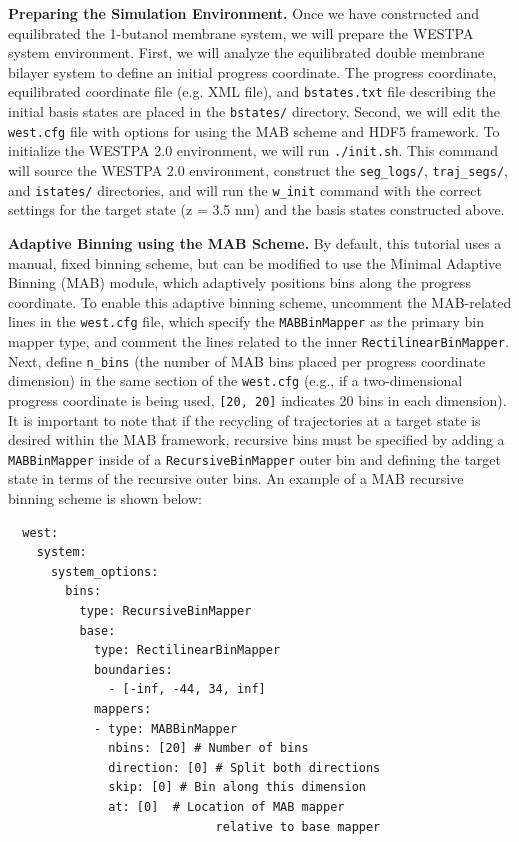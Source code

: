 \textbf{Preparing the Simulation Environment.}  Once we have constructed and equilibrated the 1-butanol membrane system, we will prepare the WESTPA system environment. 
First, we will analyze the equilibrated double membrane bilayer system to define an initial progress coordinate. 
The progress coordinate, equilibrated coordinate file (e.g. XML file), and \verb|bstates.txt| file describing the initial basis states are placed in the \verb|bstates/| directory. 
Second, we will edit the \verb|west.cfg| file with options for using the MAB scheme and HDF5 framework. 
To initialize the WESTPA 2.0 environment, we will run \verb|./init.sh|. 
This command will source the WESTPA 2.0 environment, construct the \verb|seg_logs/|, \verb|traj_segs/|, and \verb|istates/| directories, and will run the \verb|w_init| command with the correct settings for the target state (z = 3.5 nm) and the basis states constructed above.

\textbf{Adaptive Binning using the MAB Scheme.} By default, this tutorial uses a manual, fixed binning scheme, but can be modified to use the Minimal Adaptive Binning (MAB) module, which adaptively positions bins along the progress coordinate. 
To enable this adaptive binning scheme, uncomment the MAB-related lines in the \verb|west.cfg| file, which specify the \verb|MABBinMapper| as the primary bin mapper type, and comment the lines related to the inner \verb|RectilinearBinMapper|. 
Next, define \verb|n_bins| (the number of MAB bins placed per progress coordinate dimension) in the same section of the \verb|west.cfg| (e.g., if a two-dimensional progress coordinate is being used, \verb|[20, 20]| indicates 20 bins in each dimension). 
It is important to note that if the recycling of trajectories at a target state is desired within the MAB framework, recursive bins must be specified by adding a \verb|MABBinMapper| inside of a \verb|RecursiveBinMapper| outer bin and defining the target state in terms of the recursive outer bins. 
An example of a MAB recursive binning scheme is shown below:

\begin{verbatim}
  west:
    system:
      system_options:
        bins:
          type: RecursiveBinMapper
          base:
            type: RectilinearBinMapper
            boundaries:
              - [-inf, -44, 34, inf]
            mappers:
            - type: MABBinMapper
              nbins: [20] # Number of bins
              direction: [0] # Split both directions
              skip: [0] # Bin along this dimension
              at: [0]  # Location of MAB mapper
                             relative to base mapper
\end{verbatim}

